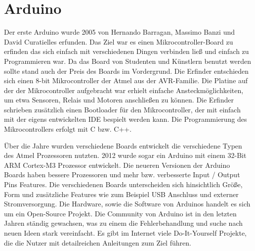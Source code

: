 \section{Arduino}
\label{sec:Arduino}
Der erste Arduino wurde 2005 von Hernando Barragan, Massimo Banzi und David Curatielles erfunden. Das Ziel war es einen Mikrocontroller-Board zu erfinden das sich einfach mit verschiedenen Dingen verbinden ließ und einfach zu Programmieren war. Da das Board von Studenten und Künstlern benutzt werden sollte stand auch der Preis des Boards im Vordergrund. Die Erfinder entschieden sich einen 8-bit Mikrocontroller der Atmel aus der AVR-Familie. Die Platine auf der der Mikrocontroller aufgebracht war erhielt einfache Ansteckmöglichkeiten, um etwa Sensoren, Relais und Motoren anschließen zu können. Die Erfinder schrieben zusätzlich einen Bootloader für den Mikrocontroller, der mit einfach mit der eigens entwickelten \ac{IDE} bespielt werden kann. Die Programmierung des Mikrocontrollers erfolgt mit C bzw. C++.

Über die Jahre wurden verschiedene Boards entwickelt die verschiedene Typen des Atmel Prozessoren nutzten. 2012 wurde sogar ein Arduino mit einem 32-Bit ARM Cortex-M3 Prozessor entwickelt. Die neueren Versionen der Arduino Boards haben bessere Prozessoren und mehr bzw. verbesserte Input / Output Pins Features. Die verschiedenen Boards unterscheiden sich hinsichtlich Größe, Form und zusätzliche Features wie zum Beispiel USB Anschluss und externer Stromversorgung. Die Hardware, sowie die Software von Arduinos handelt es sich um ein Open-Source Projekt. Die Community von Arduino ist in den letzten Jahren ständig gewachsen, was zu einem die Fehlerbehandlung und suche nach neuen Ideen stark vereinfacht. Es gibt im Internet viele Do-It-Yourself Projekte, die die Nutzer mit detailreichen Anleitungen zum Ziel führen.

